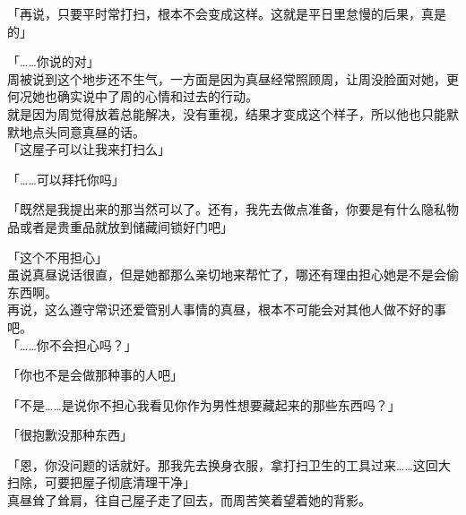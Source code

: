 「再说，只要平时常打扫，根本不会变成这样。这就是平日里怠慢的后果，真是的」

「……你说的对」\\

周被说到这个地步还不生气，一方面是因为真昼经常照顾周，让周没脸面对她，更何况她也确实说中了周的心情和过去的行动。\\

就是因为周觉得放着总能解决，没有重视，结果才变成这个样子，所以他也只能默默地点头同意真昼的话。\\

「这屋子可以让我来打扫么」

「……可以拜托你吗」

「既然是我提出来的那当然可以了。还有，我先去做点准备，你要是有什么隐私物品或者是贵重品就放到储藏间锁好门吧」

「这个不用担心」\\

虽说真昼说话很直，但是她都那么亲切地来帮忙了，哪还有理由担心她是不是会偷东西啊。\\

再说，这么遵守常识还爱管别人事情的真昼，根本不可能会对其他人做不好的事吧。\\

「……你不会担心吗？」

「你也不是会做那种事的人吧」

「不是……是说你不担心我看见你作为男性想要藏起来的那些东西吗？」

「很抱歉没那种东西」

「恩，你没问题的话就好。那我先去换身衣服，拿打扫卫生的工具过来……这回大扫除，可要把屋子彻底清理干净」\\

真昼耸了耸肩，往自己屋子走了回去，而周苦笑着望着她的背影。
